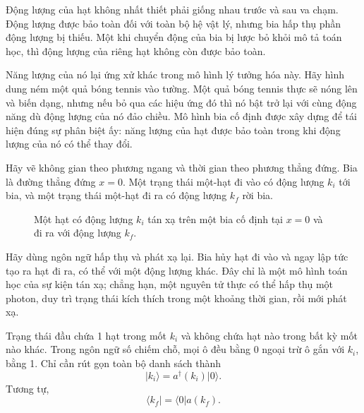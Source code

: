 Động lượng của hạt không nhất thiết phải giống nhau trước và sau va chạm. Động lượng được bảo toàn đối với toàn bộ hệ vật lý, nhưng bia hấp thụ phần động lượng bị thiếu. Một khi chuyển động của bia bị lược bỏ khỏi mô tả toán học, thì động lượng của riêng hạt không còn được bảo toàn.

Năng lượng của nó lại ứng xử khác trong mô hình lý tưởng hóa này. Hãy hình dung ném một quả bóng tennis vào tường. Một quả bóng tennis thực sẽ nóng lên và biến dạng, nhưng nếu bỏ qua các hiệu ứng đó thì nó bật trở lại với cùng động năng dù động lượng của nó đảo chiều. Mô hình bia cố định được xây dựng để tái hiện đúng sự phân biệt ấy: năng lượng của hạt được bảo toàn trong khi động lượng của nó có thể thay đổi.

Hãy vẽ không gian theo phương ngang và thời gian theo phương thẳng đứng. Bia là đường thẳng đứng \(x=0\). Một trạng thái một-hạt đi vào có động lượng \(k_i\) tới bia, và một trạng thái một-hạt đi ra có động lượng \(k_f\) rời bia.

\begin{figure}[h]
\centering
{}
\caption{Một hạt có động lượng \(k_i\) tán xạ trên một bia cố định tại \(x=0\) và đi ra với động lượng \(k_f\).}
\end{figure}

Hãy dùng ngôn ngữ hấp thụ và phát xạ lại. Bia hủy hạt đi vào và ngay lập tức tạo ra hạt đi ra, có thể với một động lượng khác. Đây chỉ là một mô hình toán học của sự kiện tán xạ; chẳng hạn, một nguyên tử thực có thể hấp thụ một photon, duy trì trạng thái kích thích trong một khoảng thời gian, rồi mới phát xạ.

\begin{classroomqa}
\end{classroomqa}

Trạng thái đầu chứa 1 hạt trong mốt \(k_i\) và không chứa hạt nào trong bất kỳ mốt nào khác. Trong ngôn ngữ số chiếm chỗ, mọi ô đều bằng 0 ngoại trừ ô gắn với \(k_i\), bằng 1. Chỉ cần rút gọn toàn bộ danh sách thành
\begin{equation}
\lvert k_i\rangle=a^\dagger(k_i)\lvert0\rangle.
\end{equation}
Tương tự,
\begin{equation}
\langle k_f\rvert=\langle0\rvert a(k_f).
\end{equation}


